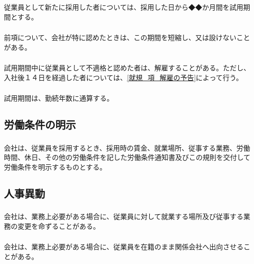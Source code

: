 \documentclass{jsarticle}
\begin{document}
\subsubsection{}
\label{就規_項_試用期間}
従業員として新たに採用した者については、採用した日から◆◆か月間を試用期間とする。
\subsubsection{}
\label{就規_項_試用期間の短縮等}
前項について、会社が特に認めたときは、この期間を短縮し、又は設けないことがある。
\subsubsection{}
\label{就規_項_試用期間中の解雇}
試用期間中に従業員として不適格と認めた者は、解雇することがある。ただし、入社後１４日を経過した者については、\ref{就規_項_解雇の予告}によって行う。
\subsubsection{}
\label{就規_項_試用期間の勤続年数への通算}
試用期間は、勤続年数に通算する。

\subsection{労働条件の明示}
\label{就規_条_労働条件の明示}
\subsubsection{}
\label{就規_項_労働条件の明示}
会社は、従業員を採用するとき、採用時の賃金、就業場所、従事する業務、労働時間、休日、その他の労働条件を記した労働条件通知書及びこの規則を交付して労働条件を明示するものとする。

\subsection{人事異動}
\label{就規_条_人事異動}
\subsubsection{}
\label{就規_項_人事異動}
会社は、業務上必要がある場合に、従業員に対して就業する場所及び従事する業務の変更を命ずることがある。
\subsubsection{}
\label{就規_項_在籍出向}
会社は、業務上必要がある場合に、従業員を在籍のまま関係会社へ出向させることがある。
\end{document}
